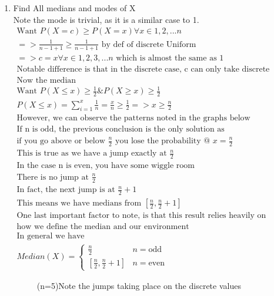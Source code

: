 \documentclass[11pt]{article}
\begin{document}
\begin{enumerate}
\begin{enumerate}
	\item Find All medians and modes of X\\
	Note the mode is trivial, as it is a similar case to 1.
	\begin{gather}
	\text{Want } P(X=c)\ge P(X=x)\forall x \in 1,2,...n\\
	=> \frac{1}{n-1+1} \ge \frac{1}{n-1+1}  \text{ by def of discrete Uniform}\\
	=> c=x \forall x \in 1,2,3,...n \text{ which is almost the same as 1}\\
	\text{Notable difference is that in the discrete case, c can only take discrete values}\\
	\text{Now the median}\\
	\text{Want } P(X\le x) \ge \frac{1}{2} \& P(X\ge x) \ge \frac{1}{2}\\
	P(X\le x) = \sum_{i=1}^{x}\frac{1}{n} = \frac{x}{n} \ge \frac{1}{2} => x \ge \frac{n}{2}\\
	\text{However, we can observe the patterns noted in the graphs below}\\
	\text{If n is odd, the previous conclusion is the only solution as }\\
	\text{if you go above or below } \frac{n}{2} \text{ you lose the probability @ } x = \frac{n}{2}\\
	\text{This is true as we have a jump exactly at }\frac{n}{2}\\
	\text{In the case n is even, you have some wiggle room}\\
	\text{There is no jump at }\frac{n}{2}\\
	\text{In fact, the next jump is at }\frac{n}{2}+1\\
	\text{This means we have medians from }[\frac{n}{2},\frac{n}{2}+1]\\
	\text{One last important factor to note, is that this result relies heavily on}\\
	\text{how we define the median and our environment}\\
	\text{In general we have}\\
	 Median(X) = 
	 \begin{cases}
	 \frac{n}{2} & n=\text{odd} \\
	 [\frac{n}{2},\frac{n}{2}+1] & n=\text{even}
	 \end{cases}
	\end{gather}
	\begin{figure}[H]
		\centering
		\caption{(n=5)Note the jumps taking place on the discrete values}

\end{figure}
\end{enumerate}
\end{enumerate}
\end{document}
